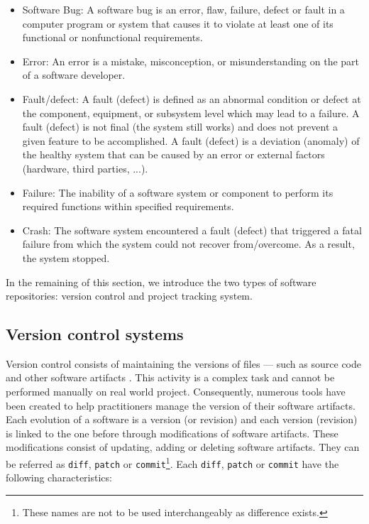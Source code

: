 \begin{itemize}
	\item Software Bug: A software bug is an error, flaw, failure, defect or fault in a computer program or system that causes it to violate at least one of its functional or nonfunctional requirements.
	\item Error: An error is a mistake, misconception, or misunderstanding on the part of a software developer.
	\item Fault/defect: A fault (defect) is defined as an abnormal condition or defect at the component, equipment, or subsystem level which may lead to a failure. A fault (defect) is not final (the system still works) and does not prevent a given feature to be accomplished.  A fault (defect) is a deviation (anomaly) of the healthy system that can be caused by an error or external factors (hardware, third parties, ...).
	\item Failure: The inability of a software system or component to perform its required functions within specified requirements.
	\item Crash: The software system encountered a fault (defect) that triggered a fatal failure from which the system could not recover from/overcome. As a result,  the system stopped.
\end{itemize}

In the remaining of this section, we introduce the two types of software repositories: version control and project tracking system.

\subsection{Version control systems\label{sec:version-control}}

Version control consists of maintaining the versions of files --- such as source code and other software artifacts \cite{Zeller1997}.
This activity is a complex task and cannot be performed manually on real world project.
Consequently, numerous tools have been created to help practitioners manage the version of their software artifacts.
Each evolution of a software is a version (or revision) and each version (revision) is linked to the one before through modifications of software artifacts.
These modifications consist of updating, adding or deleting software artifacts.
They can be referred as \texttt{diff}, {\tt patch} or {\tt commit}\footnote{These names are not to be used interchangeably as difference exists.}.
Each \texttt{diff}, {\tt patch} or {\tt commit} have the following characteristics:

